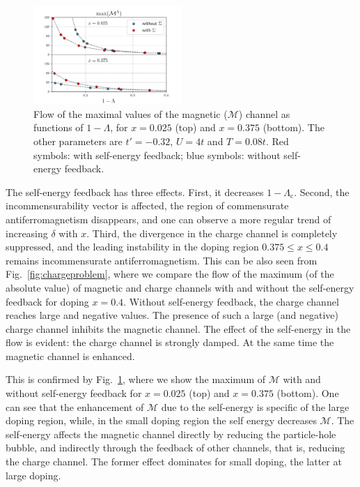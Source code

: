 \begin{figure}
\includegraphics[width=0.50\textwidth]{images/chargeproblem_M_vs_Lambda_diff_occ.png}
\caption{Flow of the maximal values of the  magnetic ($\mathcal{M}$) channel as functions of $1-\Lambda$, for  $x=0.025$ (top) and $x=0.375$ (bottom). The other parameters are $t'=-0.32$, $U=4t$ and $T=0.08t$. Red symbols: with self-energy feedback; blue symbols: without self-energy feedback. }
\label{fig:selfeffect}
\end{figure}

The self-energy feedback has three effects. First, it decreases $1-\Lambda_\mathrm{c}$.
Second, the incommensurability vector is affected, the region of commensurate antiferromagnetism disappears, and one can observe a more regular trend of increasing $\delta$ with $x$.
Third, the divergence in the charge channel is completely suppressed, and the leading instability in the doping region $0.375\le x \le 0.4$ remains incommensurate antiferromagnetism. 
This can be also seen from Fig.~\ref{fig:chargeproblem}, where we compare the flow of the maximum (of the absolute value) of magnetic and charge channels with and without the self-energy feedback for doping $x=0.4$.
Without self-energy feedback, the charge channel reaches large and negative values.
The presence of such a large (and negative) charge channel inhibits the magnetic channel.    
The effect of the self-energy in the flow is evident: the charge channel is strongly damped.  
At the same time the magnetic channel is enhanced.

This is confirmed by Fig.~\ref{fig:selfeffect}, where we show the maximum of $\mathcal{M}$ with and without self-energy feedback for $x=0.025$ (top) and $x=0.375$ (bottom).  
One can see that the enhancement of $\mathcal{M}$ due to the self-energy is specific of the large doping region, while, in the small doping region the self energy decreases $\mathcal{M}$.  
The self-energy affects the magnetic channel directly by reducing the particle-hole bubble, and indirectly through the feedback of other channels, that is, reducing the charge channel. The former effect dominates for small doping, the latter at large doping.


